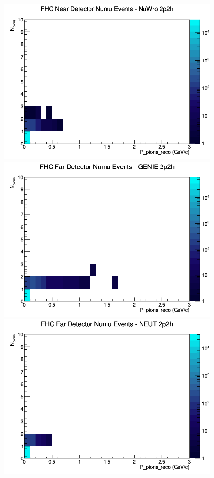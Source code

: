 \documentclass[12pt]{article}
\begin{document}
\begin{figure}[h]
\includegraphics[width=\linewidth]{eff_N_P/GAr/pions/2p2h_FHC_ND_numu_N_P_NuWro.png}
\endminipage
\newline
{}
\includegraphics[width=\linewidth]{eff_N_P/GAr/pions/2p2h_FHC_FD_numu_N_P_GENIE.png}
\endminipage
{}
\includegraphics[width=\linewidth]{eff_N_P/GAr/pions/2p2h_FHC_FD_numu_N_P_NEUT.png}

\end{figure}
\end{document}
